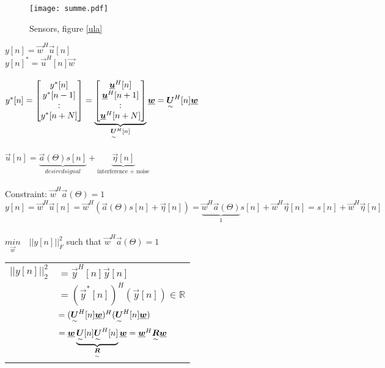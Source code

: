 \begin{figure}[H]
	\centering
	\texttt{[image: summe.pdf]}
	\caption{Sensors, figure \ref{ula}}
	\label{summe} 
\end{figure}
\begin{doublespace}
$y[n]= \vec{w}^H \vec{u}[n]$\\
$y[n]^*= \vec{u}^H[n] \vec{w}$\\ \ \\
$y^*[n] = \begin{bmatrix}y^*[n]\\ y^*[n-1]\\ : \\ y^*[n+N]\end{bmatrix} = \underbrace{\begin{bmatrix}\underline{\boldsymbol {u}}^H[n]\\ \underline{\boldsymbol {u}}^H[n+1]\\ :\\ \underline{\boldsymbol {u}}^H[n+N]\end{bmatrix}}_{\underset{\sim}{\boldsymbol {U}}^H[n]}\underline{\boldsymbol {w}}= \underset{\sim}{\boldsymbol {U}}^H[n]\underline{\boldsymbol {w}}$\\ \\
$\vec{u}[n]= \underbrace{\vec{a}(\Theta) s[n]}_{desired signal}+ \underbrace{\vec{\eta}[n]}_{\text{interference + noise}}$\\ \\
Constraint: $\vec{w}^H \vec{a}(\Theta)=1$\\
$y[n]=\vec{w}^H \vec{u}[n] = \vec{w}^H(\vec{a}(\Theta) s[n]+ \vec{\eta}[n])= \underbrace{\vec{w}^H\vec{a}(\Theta)}_1s[n]+ \vec{w}^H\vec{\eta}[n]= s[n] + \vec{w}^H\vec{\eta}[n]$\\\\
$\underset{\vec{w}}{min} \quad ||y[n]||_F^2$ \quad such that $\vec{w}^H \vec{a}(\Theta)=1$\\
\begin{tabular}{ll}
$||y[n]||_2^2$ &$= \vec{y}^H[n]\vec{y}[n]$\\
 &$=(\vec{y}^*[n])^H(\vec{y}[n]) \in \mathbb{R}$\\
 &$= (\underset{\sim}{\boldsymbol {U}}^H[n]\underline{\boldsymbol {w}})^H(\underset{\sim}{\boldsymbol {U}}^H[n]\underline{\boldsymbol {w}})$\\
 &$= \underline{\boldsymbol {w}} \underbrace{\underset{\sim}{\boldsymbol {U}}[n]\underset{\sim}{\boldsymbol {U}}^H[n]}_{\underset{\sim}{\boldsymbol {R}}}{\underline{\boldsymbol {w}}}= \underline{\boldsymbol {w}}^H\underset{\sim}{\boldsymbol {R}}\underline{\boldsymbol {w}}$\\
\end{tabular}
\end{doublespace}


\newpage